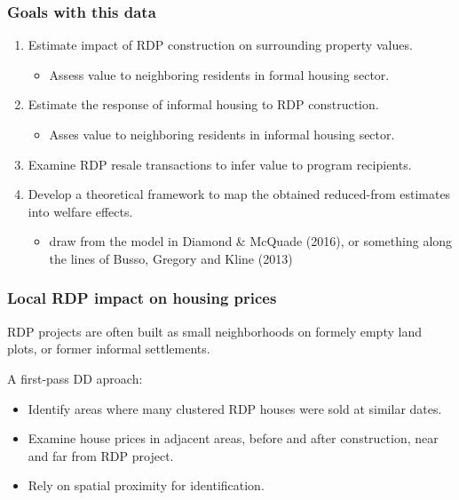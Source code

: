 \documentclass[aspectratio=149]{beamer}
\begin{document}
\begin{frame}
\frametitle{Goals with this data}
\begin{enumerate}
\item Estimate impact of RDP construction on surrounding property values.
\vspace{-4mm}
\begin{itemize}
  \item Assess value to neighboring residents in formal housing sector.
\end{itemize}
\vspace{1mm}
\item Estimate the response of informal housing to RDP construction.
\begin{itemize}
  \item Asses value to neighboring residents in informal housing sector.
\end{itemize}
\vspace{1mm}
\item Examine RDP resale transactions to infer value to program recipients.
\vspace{1mm}
\vspace{1mm}
  \item Develop a theoretical framework to map the obtained reduced-from estimates into welfare effects.
  \begin{itemize}
  \item draw from the model in Diamond \& McQuade (2016), or something along the lines of Busso, Gregory and Kline (2013)
\end{itemize}
\end{enumerate}
\end{frame}


\begin{frame}
\frametitle{Local RDP impact on housing prices}

RDP projects are often built as small neighborhoods on formely empty land plots, or former informal settlements. 

\vspace{1em}


A first-pass DD aproach:
\begin{itemize}
  \item Identify areas where many clustered RDP houses were sold at similar dates.
  \item Examine house prices in adjacent areas, before and after construction, near and far from RDP project.
  \item Rely on spatial proximity for identification. 

\end{itemize}

\end{frame}
\end{document}
